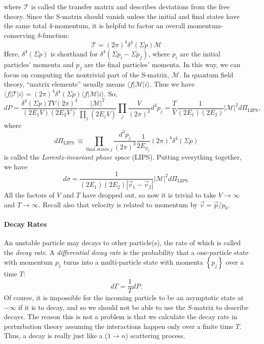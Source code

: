 \documentclass[aps,prb,superscriptaddress,nofootinbib]{revtex4}
\begin{document}
where $\mathcal{T}$ is called the transfer matrix and describes deviations from the free theory. 
Since the S-matrix should vanish unless the initial and final states have the same total 4-momentum, it is helpful to factor an overall momentum-conserving $\delta$-function:
\begin{equation}
	\mathcal{T}=(2 \pi)^{4} \delta^{4}(\Sigma p) \mathcal{M}
\end{equation}
Here, $\delta^{4}(\Sigma p)$ is shorthand for $\delta^{4}\left(\Sigma p_{i}-\Sigma p_{f}\right)$, where $p_{i}$ are the initial particles' momenta and $p_{f}$ are the final particles' momenta. 
In this way, we can focus on computing the nontrivial part of the S-matrix, $\mathcal{M}$. 
In quantum field theory, ``matrix elements'' usually means $\langle f|\mathcal{M}| i\rangle$. Thus we have $\langle f|\mathcal T| i\rangle=(2 \pi)^{4} \delta^{4}(\Sigma p)\langle f|\mathcal{M}| i\rangle$.
So,
\begin{equation}
	d P =\frac{\delta^{4}(\Sigma p) T V(2 \pi)^{4}}{\left(2 E_{1} V\right)\left(2 E_{2} V\right)} \frac{|\mathcal{M}|^{2}}{\prod_{j}\left(2 E_{j} V\right)} \prod_{j} \frac{V}{(2 \pi)^{3}} d^{3} p_{j} 
	=\frac{T}{V} \frac{1}{\left(2 E_{1}\right)\left(2 E_{2}\right)}|\mathcal{M}|^{2} d \Pi_{\mathrm{LIPS}},
\end{equation}
where
\begin{equation}
	d \Pi_{\text {LIPS }} \equiv \prod_{\text {final states } j} \frac{d^{3} p_{j}}{(2 \pi)^{3}} \frac{1}{2 E_{p_{j}}}(2 \pi)^{4} \delta^{4}(\Sigma p)
\end{equation}
is called the \textit{Lorentz-invariant phase space} (LIPS).
Putting everything together, we have
\begin{equation}
	d \sigma=\frac{1}{\left(2 E_{1}\right)\left(2 E_{2}\right)\left|\vec{v}_{1}-\vec{v}_{2}\right|}|\mathcal{M}|^{2} d \Pi_{\text {LIPS }}
\end{equation}
All the factors of $V$ and $T$ have dropped out, so now it is trivial to take $V \rightarrow \infty$ and $T \rightarrow \infty$. Recall also that velocity is related to momentum by $\vec{v}=\vec{p} / p_{0}$.


\paragraph*{Decay Rates}
An unstable particle may decays to other particle(s), the rate of which is called the \textit{decay rate}.
A \textit{differential decay rate} is the probability that a one-particle state with momentum $p_{1}$ turns into a multi-particle state with momenta $\left\{p_{j}\right\}$ over a time $T$:
\begin{equation}
	d \Gamma=\frac{1}{T} d P .
\end{equation}
Of course, it is impossible for the incoming particle to be an asymptotic state at $-\infty$ if it is to decay, and so we should not be able to use the $S$-matrix to describe decays. 
The reason this is not a problem is that we calculate the decay rate in perturbation theory assuming the interactions happen only over a finite time $T$. 
Thus, a decay is really just like a ($1 \rightarrow n$) scattering process.
\end{document}

